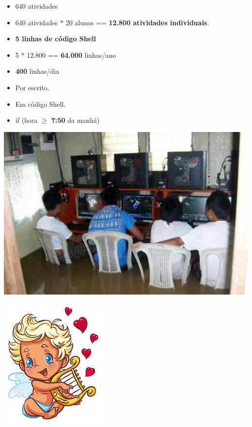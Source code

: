 {	\begin{itemize}
		\item  {\LARGE 640 atividades}	
		\item  640 atividades $\ast$ 20 alunos == \textbf{12.800 atividades individuais}.
		\item \textbf{5 linhas de código Shell}
		\item 5 $\ast$ 12.800 == \textbf{64.000} linhas/ano
		\item \textbf{400} linhas/dia
		\item Por escrito.
		\item Em código Shell.
		\item if (hora \textbf{$\geq$ 7:50} da manhã)	
	\end{itemize}

   \vfill
\pagebreak

\vspace*{15mm}
\begin{center}
\end{center}
		
		   \vfill
		\pagebreak

\begin{center}
	\includegraphics[height=.9\textheight]{./IMG-GIT/enchente.jpg}
\end{center}


\vfill
\pagebreak

\begin{center}
	\includegraphics[height=.7\textheight]{./IMG-GIT/anjo.jpg}
	

\end{center}}
